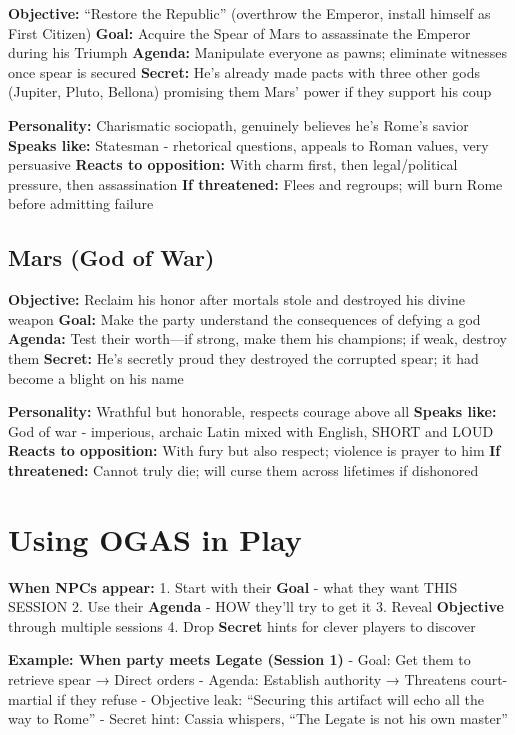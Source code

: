 \documentclass[
]{book}
\begin{document}
\textbf{Objective:} ``Restore the Republic'' (overthrow the Emperor,
install himself as First Citizen) \textbf{Goal:} Acquire the Spear of
Mars to assassinate the Emperor during his Triumph \textbf{Agenda:}
Manipulate everyone as pawns; eliminate witnesses once spear is secured
\textbf{Secret:} He's already made pacts with three other gods (Jupiter,
Pluto, Bellona) promising them Mars' power if they support his coup

\textbf{Personality:} Charismatic sociopath, genuinely believes he's
Rome's savior \textbf{Speaks like:} Statesman - rhetorical questions,
appeals to Roman values, very persuasive \textbf{Reacts to opposition:}
With charm first, then legal/political pressure, then assassination
\textbf{If threatened:} Flees and regroups; will burn Rome before
admitting failure

\subsection{Mars (God of War)}\label{mars-god-of-war}

\textbf{Objective:} Reclaim his honor after mortals stole and destroyed
his divine weapon \textbf{Goal:} Make the party understand the
consequences of defying a god \textbf{Agenda:} Test their worth---if
strong, make them his champions; if weak, destroy them \textbf{Secret:}
He's secretly proud they destroyed the corrupted spear; it had become a
blight on his name

\textbf{Personality:} Wrathful but honorable, respects courage above all
\textbf{Speaks like:} God of war - imperious, archaic Latin mixed with
English, SHORT and LOUD \textbf{Reacts to opposition:} With fury but
also respect; violence is prayer to him \textbf{If threatened:} Cannot
truly die; will curse them across lifetimes if dishonored

\section{Using OGAS in Play}\label{using-ogas-in-play}

\textbf{When NPCs appear:} 1. Start with their \textbf{Goal} - what they
want THIS SESSION 2. Use their \textbf{Agenda} - HOW they'll try to get
it 3. Reveal \textbf{Objective} through multiple sessions 4. Drop
\textbf{Secret} hints for clever players to discover

\textbf{Example: When party meets Legate (Session 1)} - Goal: Get them
to retrieve spear → Direct orders - Agenda: Establish authority →
Threatens court-martial if they refuse - Objective leak: ``Securing this
artifact will echo all the way to Rome'' - Secret hint: Cassia whispers,
``The Legate is not his own master''
\end{document}
